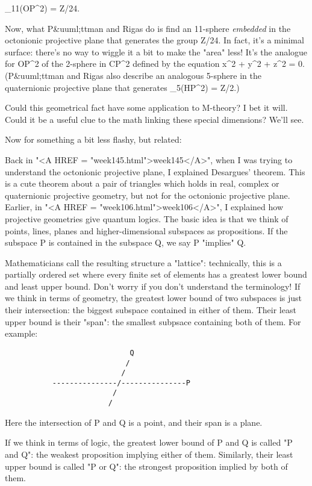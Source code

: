 \pi _{11}(OP^{2}) = Z/24.

Now, what P&uuml;ttman and Rigas do is find an 11-sphere \emph{embedded}
in the octonionic projective plane that generates the group Z/24.
In fact, it's a minimal surface: there's no way to wiggle it a
bit to make the "area" less!  It's the analogue
for OP^{2} of the 2-sphere in CP^{2} defined by
the equation x^{2} + y^{2} + z^{2} = 0.
(P&uuml;ttman and Rigas also describe an analogous 5-sphere in the
quaternionic projective plane that generates \pi _{5}(HP^{2}) 
= Z/2.)

Could this geometrical fact have some application to M-theory?  I bet 
it will.  Could it be a useful clue to the math linking these special 
dimensions?  We'll see.

Now for something a bit less flashy, but related:

Back in "<A HREF = "week145.html">week145</A>", when I was
trying to understand the octonionic projective plane, I explained
Desargues' theorem.  This is a cute theorem about a pair of triangles
which holds in real, complex or quaternionic projective geometry, but
not for the octonionic projective plane.  Earlier, in "<A HREF =
"week106.html">week106</A>", I explained how projective geometries
give quantum logics.  The basic idea is that we think of points, lines,
planes and higher-dimensional subspaces as propositions.  If the
subspace P is contained in the subspace Q, we say P "implies" Q.


Mathematicians call the resulting structure a "lattice":
technically, this is a partially ordered set where every finite set of
elements has a greatest lower bound and least upper bound.  Don't worry
if you don't understand the terminology!  If we think in terms of
geometry, the greatest lower bound of two subspaces is just their
intersection: the biggest subspace contained in either of them.  Their
least upper bound is their "span": the smallest subpsace
containing both of them.  For example:

\begin{verbatim}
                             Q
                            /
                           /
           ---------------/---------------P
                         /
                        /

\end{verbatim}
    
Here the intersection of P and Q is a point, and their span is a
plane.  

If we think in terms of logic, the greatest lower bound of P and Q
is called "P and Q": the weakest proposition implying either of
them.  Similarly, their least upper bound is called "P or Q": the
strongest proposition implied by both of them.

